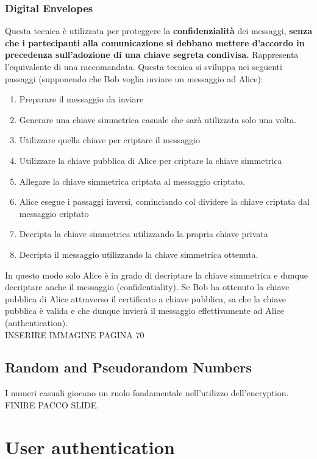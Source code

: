 \documentclass[12pt]{article}
\begin{document}
		\subsubsection{Digital Envelopes}
			Questa tecnica è utilizzata per proteggere la \textbf{confidenzialità} dei messaggi, \textbf{senza che i partecipanti alla comunicazione si debbano mettere d'accordo in precedenza sull'adozione di una chiave segreta condivisa.} Rappresenta l'equivalente di una raccomandata. Questa tecnica si sviluppa nei seguenti passaggi (supponendo che Bob voglia inviare un messaggio ad Alice):
			\begin{enumerate}
				\item Preparare il messaggio da inviare
				\item Generare una chiave simmetrica casuale che sarà utilizzata solo una volta.
				\item Utilizzare quella chiave per criptare il messaggio
				\item Utilizzare la chiave pubblica di Alice per criptare la chiave simmetrica 
				\item Allegare la chiave simmetrica criptata al messaggio criptato.
				\item Alice esegue i passaggi inversi, cominciando col dividere la chiave criptata dal messaggio criptato
				\item Decripta la chiave simmetrica utilizzando la propria chiave privata
				\item Decripta il messaggio utilizzando la chiave simmetrica ottenuta.
			\end{enumerate} 
			In questo modo solo Alice è in grado di decriptare la chiave simmetrica e dunque decriptare anche il messaggio (confidentiality). Se Bob ha ottenuto la chiave pubblica di Alice attraverso il certificato a chiave pubblica, sa che la chiave pubblica è valida e che dunque invierà il messaggio effettivamente ad Alice (authentication).\\
			INSERIRE IMMAGINE PAGINA 70\\
	\subsection{Random and Pseudorandom Numbers}
		I numeri casuali giocano un ruolo fondamentale nell'utilizzo dell'encryption.
		FINIRE PACCO SLIDE.
\section{User authentication}
\end{document}
